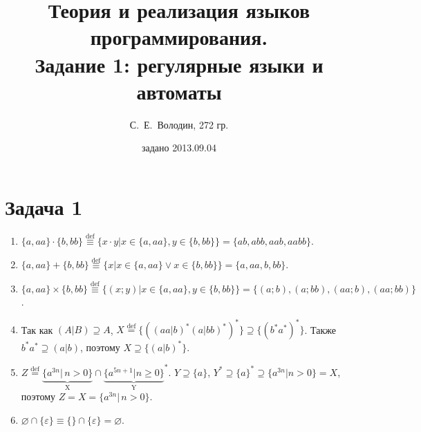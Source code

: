 \documentclass[a4paper]{article}
\title{Теория и реализация языков программирования.\\Задание 1: регулярные языки и автоматы}
\date{задано 2013.09.04}
\author{С.~Е.~Володин, 272 гр.}
\begin{document}
\maketitle
\section*{Задача 1}
\begin{enumerate}
\item $\{a,aa\}\cdot\{b,bb\}\overset{\mathrm{def}}{\equiv}\{x\cdot y|x\in \{a,aa\},y\in \{b,bb\}\}=\{ab,abb,aab,aabb\}.$
\item $\{a,aa\}+\{b,bb\}\overset{\mathrm{def}}{\equiv}\{x|x\in \{a,aa\} \vee x\in \{b,bb\}\}=\{a,aa,b,bb\}$.
\item $\{a,aa\}\times\{b,bb\}\overset{\mathrm{def}}{\equiv}\{(x;y)|x\in \{a,aa\}, y\in \{b,bb\}\}=\{(a;b),(a;bb),(aa;b),(aa;bb)\}$.
\item Так как $(A|B)\supseteq A$, $X\overset{\mathrm{def}}{=}\{((aa|b)^*(a|bb)^*)^*\}\supseteq \{(b^*a^*)^*\}$. Также $b^*a^*\supseteq (a|b)$, поэтому $X\supseteq \{(a|b)^*\}$.
\item $Z\overset{\mathrm{def}}{=}\underbrace{\{ a^{3n} | \, n>0\}}_\text{X} \cap {\underbrace{\{ a^{5n+1} | n \geq 0\}}_\text{Y}}^*$. $Y\supseteq \{a\}$, $Y^*\supseteq\{a\}^*\supseteq \{a^{3n}|n>0\}=X$, поэтому $Z=X=\{ a^{3n} | \, n>0\}$.
\item $\varnothing\cap\{\varepsilon\}\equiv\{\}\cap\{\varepsilon\}=\varnothing$.
\end{enumerate}
\end{document}
